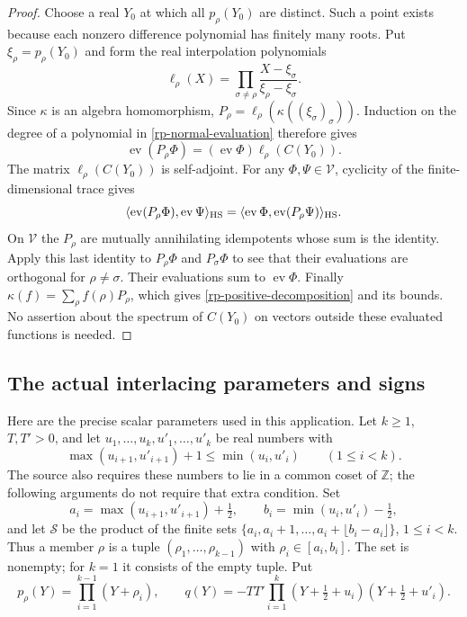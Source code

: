 \begin{proof}
Choose a real $Y_0$ at which all $p_\rho(Y_0)$ are
distinct.  Such a point exists because each nonzero
difference polynomial has finitely many roots.
Put $\xi_\rho=p_\rho(Y_0)$ and form the real
interpolation polynomials
\[
 \ell_\rho(X)=
       \prod_{\sigma\ne\rho}\frac{X-\xi_\sigma}{\xi_\rho-\xi_\sigma}.
\]
Since $\kappa$ is an algebra homomorphism,
$P_\rho=\ell_\rho(\kappa((\xi_\sigma)_\sigma))$.
Induction on the degree of a polynomial in
\eqref{rp-normal-evaluation} therefore gives
\[
       \operatorname{ev}(P_\rho\Phi)
          =(\operatorname{ev}\Phi)\ell_\rho(C(Y_0)).
\]
The matrix $\ell_\rho(C(Y_0))$ is self-adjoint.
For any $\Phi,\Psi\in\mathcal V$, cyclicity of the
finite-dimensional trace gives
\[
 \langle\operatorname{ev}(P_\rho\Phi),\operatorname{ev}\Psi\rangle_{\rm HS}
 =\langle\operatorname{ev}\Phi,\operatorname{ev}(P_\rho\Psi)\rangle_{\rm HS}.
\]
On $\mathcal V$ the $P_\rho$ are mutually annihilating
idempotents whose sum is the identity.  Apply this last
identity to $P_\rho\Phi$ and $P_\sigma\Phi$ to see that
their evaluations are orthogonal for $\rho\ne\sigma$.
Their evaluations sum to $\operatorname{ev}\Phi$.
Finally $\kappa(f)=\sum_\rho f(\rho)P_\rho$, which gives
\eqref{rp-positive-decomposition} and its bounds.
No assertion about the spectrum of $C(Y_0)$ on vectors
outside these evaluated functions is needed.
\end{proof}

\subsection{The actual interlacing parameters and signs}

Here are the precise scalar parameters used in this
application.  Let $k\geq1$, $T,T'>0$, and let
$u_1,\ldots,u_k,u'_1,\ldots,u'_k$ be real numbers with
\begin{equation}\label{rp-interlacing}
 \max(u_{i+1},u'_{i+1})+1
              \leq\min(u_i,u'_i)\qquad(1\leq i<k).
\end{equation}
The source also requires these numbers to lie in a
common coset of $\mathbb Z$; the following arguments
do not require that extra condition.
Set
\[
 a_i=\max(u_{i+1},u'_{i+1})+\tfrac12,\qquad
 b_i=\min(u_i,u'_i)-\tfrac12,
\]
and let $\mathcal S$ be the product of the finite sets
$\{a_i,a_i+1,\ldots,a_i+\lfloor b_i-a_i\rfloor\}$,
$1\leq i<k$.  Thus a member $\rho$ is a tuple
$(\rho_1,\ldots,\rho_{k-1})$ with $\rho_i\in[a_i,b_i]$.
The set is nonempty; for $k=1$ it consists of the empty
tuple.  Put
\begin{equation}\label{rp-spectral-polynomials}
 p_\rho(Y)=\prod_{i=1}^{k-1}(Y+\rho_i),\qquad
 q(Y)=-TT'\prod_{i=1}^{k}(Y+\tfrac12+u_i)
                                  (Y+\tfrac12+u'_i).
\end{equation}


